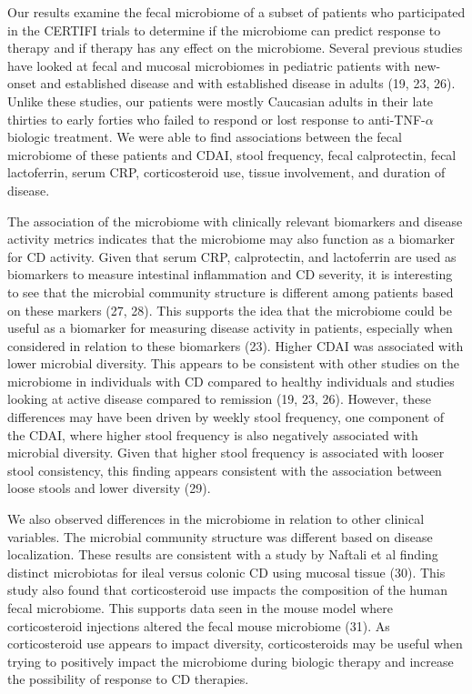 \documentclass[11pt,]{article}
\begin{document}
Our results examine the fecal microbiome of a subset of patients who
participated in the CERTIFI trials to determine if the microbiome can
predict response to therapy and if therapy has any effect on the
microbiome. Several previous studies have looked at fecal and mucosal
microbiomes in pediatric patients with new-onset and established disease
and with established disease in adults (19, 23, 26). Unlike these
studies, our patients were mostly Caucasian adults in their late
thirties to early forties who failed to respond or lost response to
anti-TNF-\({\alpha}\) biologic treatment. We were able to find
associations between the fecal microbiome of these patients and CDAI,
stool frequency, fecal calprotectin, fecal lactoferrin, serum CRP,
corticosteroid use, tissue involvement, and duration of disease.

The association of the microbiome with clinically relevant biomarkers
and disease activity metrics indicates that the microbiome may also
function as a biomarker for CD activity. Given that serum CRP,
calprotectin, and lactoferrin are used as biomarkers to measure
intestinal inflammation and CD severity, it is interesting to see that
the microbial community structure is different among patients based on
these markers (27, 28). This supports the idea that the microbiome could
be useful as a biomarker for measuring disease activity in patients,
especially when considered in relation to these biomarkers (23). Higher
CDAI was associated with lower microbial diversity. This appears to be
consistent with other studies on the microbiome in individuals with CD
compared to healthy individuals and studies looking at active disease
compared to remission (19, 23, 26). However, these differences may have
been driven by weekly stool frequency, one component of the CDAI, where
higher stool frequency is also negatively associated with microbial
diversity. Given that higher stool frequency is associated with looser
stool consistency, this finding appears consistent with the association
between loose stools and lower diversity (29).

We also observed differences in the microbiome in relation to other
clinical variables. The microbial community structure was different
based on disease localization. These results are consistent with a study
by Naftali et al finding distinct microbiotas for ileal versus colonic
CD using mucosal tissue (30). This study also found that corticosteroid
use impacts the composition of the human fecal microbiome. This supports
data seen in the mouse model where corticosteroid injections altered the
fecal mouse microbiome (31). As corticosteroid use appears to impact
diversity, corticosteroids may be useful when trying to positively
impact the microbiome during biologic therapy and increase the
possibility of response to CD therapies.
\end{document}
